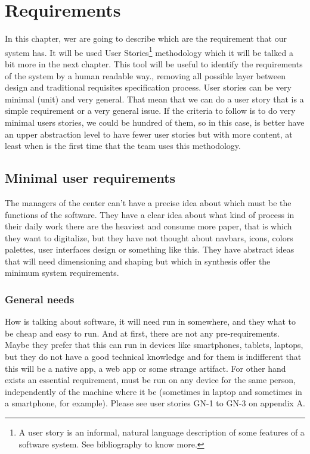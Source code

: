\chapter{Requirements}

In this chapter, wer are going to describe which are the requirement that our system has.
It will be used User Stories\footnote{A user story is an informal, natural language
description of some features of a software system. See bibliography to know more.}
methodology which it will be talked a bit more in the next chapter.
This tool will be useful to identify the requirements of the system by a
human readable way., removing all possible layer between design and traditional
requisites specification process.
\intro
User stories can be very minimal (unit) and very general. That mean that we
can do a user story that is a simple requirement or a very general issue.
If the criteria to follow is to do very minimal users stories, we could be
hundred of them, so in this case, is better have an upper abstraction level
to have fewer user stories but with more content, at least when is the
first time that the team uses this methodology.
\section{Minimal user requirements}

The managers of the center can't have a precise idea about which must be the
functions of the software. They have a clear idea about what kind of process in
their daily work there are the heaviest and consume more paper, that is which
they want to digitalize, but they have not thought about navbars, icons, colors palettes,
user interfaces design or something like this.  They have abstract ideas that will
need dimensioning and shaping but which in synthesis offer the minimum system requirements.

\subsection{General needs}

How is talking about software, it will need run in somewhere, and they what to
be cheap and easy to run. And at first, there are not any pre-requirements. Maybe
they prefer that this can run in devices like smartphones, tablets, laptops,
but they do not have a good technical knowledge and for them is indifferent that
this will be a native app, a web app or some strange artifact.
\intro
For other hand exists an essential requirement, must be run on any device for
the same person, independently of the machine where it be (sometimes in laptop
and sometimes in a smartphone, for example).
\intro
Please see user stories GN-1 to GN-3 on appendix A.


